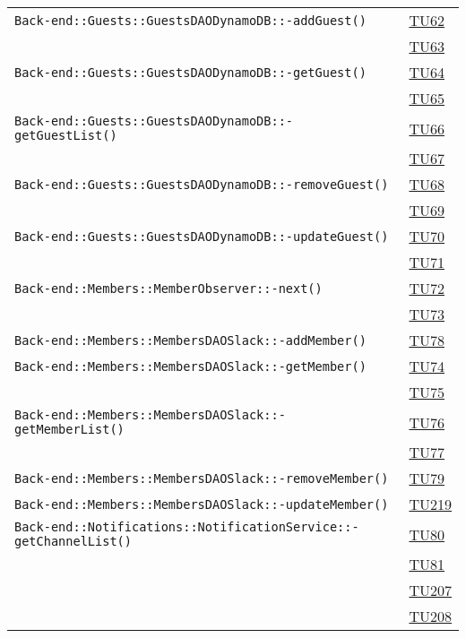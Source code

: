 \begin{longtable}{|>{\centering}m{12cm}|m{1cm}<{\centering}|}
\texttt{Back-end::Guests::GuestsDAODynamoDB::-\linebreak addGuest()} & \hyperlink{TU62}{TU62}\\ & \hyperlink{TU63}{TU63}\\ \hline
\texttt{Back-end::Guests::GuestsDAODynamoDB::-\linebreak getGuest()} & \hyperlink{TU64}{TU64}\\ & \hyperlink{TU65}{TU65}\\ \hline
\texttt{Back-end::Guests::GuestsDAODynamoDB::-\linebreak getGuestList()} & \hyperlink{TU66}{TU66}\\ & \hyperlink{TU67}{TU67}\\ \hline
\texttt{Back-end::Guests::GuestsDAODynamoDB::-\linebreak removeGuest()} & \hyperlink{TU68}{TU68}\\ & \hyperlink{TU69}{TU69}\\ \hline
\texttt{Back-end::Guests::GuestsDAODynamoDB::-\linebreak updateGuest()} & \hyperlink{TU70}{TU70}\\ & \hyperlink{TU71}{TU71}\\ \hline
\texttt{Back-end::Members::MemberObserver::-\linebreak next()} & \hyperlink{TU72}{TU72}\\ & \hyperlink{TU73}{TU73}\\ \hline
\texttt{Back-end::Members::MembersDAOSlack::-\linebreak addMember()} & \hyperlink{TU78}{TU78}\\ \hline
\texttt{Back-end::Members::MembersDAOSlack::-\linebreak getMember()} & \hyperlink{TU74}{TU74}\\ & \hyperlink{TU75}{TU75}\\ \hline
\texttt{Back-end::Members::MembersDAOSlack::-\linebreak getMemberList()} & \hyperlink{TU76}{TU76}\\ & \hyperlink{TU77}{TU77}\\ \hline
\texttt{Back-end::Members::MembersDAOSlack::-\linebreak removeMember()} & \hyperlink{TU79}{TU79}\\ \hline
\texttt{Back-end::Members::MembersDAOSlack::-\linebreak updateMember()} & \hyperlink{TU219}{TU219}\\ \hline
\texttt{Back-end::Notifications::NotificationService::-\linebreak getChannelList()} & \hyperlink{TU80}{TU80}\\ & \hyperlink{TU81}{TU81}\\ & \hyperlink{TU207}{TU207}\\ & \hyperlink{TU208}{TU208}\\ \hline

\end{longtable}

